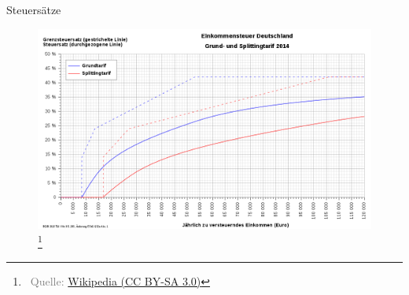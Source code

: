 \documentclass{beamer}
\let\oldfootnote\footnote
\renewcommand{\footnote}[1]
{%
	\oldfootnote
	{
		\tiny
		\textcolor{gray}{#1}
	}%
}
\newcommand{\citeurl}[2]
{%
	\footnote{\ Quelle: \href{#1}{#2}}
}
\begin{document}
			\begin{frame}{Steuersätze}
				\begin{center}
					\vspace{-0.5cm}
					\begin{figure}
						\includegraphics[width=0.9\linewidth]{images/tarifzonen-diagramm}\citeurl{https://commons.wikimedia.org/wiki/File:ESt_D_Tarif_2014_Splitting_120kEUR.svg}{Wikipedia (CC BY-SA 3.0)}
					\end{figure}
				\end{center}
			\end{frame}
			
\end{document}
